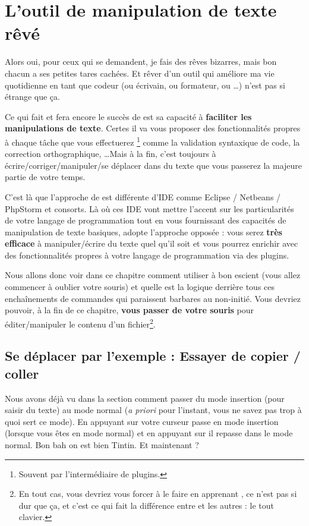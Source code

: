 \chapter{L'outil de manipulation de texte rêvé}

Alors oui, pour ceux qui se demandent, je fais des rêves bizarres, mais bon chacun a ses petites tares cachées. Et rêver d'un outil qui améliore ma vie quotidienne en tant que codeur (ou écrivain, ou formateur, ou \ldots) n'est pas si étrange que ça.

Ce qui fait et fera encore le succès de \vim est sa capacité à \textbf{faciliter les manipulations de texte}. Certes il va vous proposer des fonctionnalités propres à chaque tâche que vous effectuerez \footnote{Souvent par l'intermédiaire de plugins.} comme la validation syntaxique de code, la correction orthographique, \ldots Mais à la fin, c'est toujours à écrire/corriger/manipuler/se déplacer dans du texte que vous passerez la majeure partie de votre temps. 

C'est là que l'approche de \vim est différente d'IDE comme Eclipse / Netbeans / PhpStorm et consorts. Là où ces IDE vont mettre l'accent sur les particularités de votre langage de programmation tout en vous fournissant des capacités de manipulation de texte basiques, \vim adopte l'approche opposée : vous serez \textbf{très efficace} à manipuler/écrire du texte quel qu'il soit et vous pourrez enrichir \vim avec des fonctionnalités propres à votre langage de programmation via des plugins.

Nous allons donc voir dans ce chapitre comment utiliser \vim à bon escient (vous allez commencer à oublier votre souris) et quelle est la logique derrière tous ces enchaînements de commandes qui paraissent barbares au non-initié. Vous devriez pouvoir, à la fin de ce chapitre, \textbf{vous passer de votre souris} pour éditer/manipuler le contenu d'un fichier\footnote{En tout cas, vous devriez vous forcer à le faire en apprenant \vim, ce n'est pas si dur que ça, et c'est ce qui fait la différence entre \vim et les autres : le tout clavier.}.

\section{Se déplacer par l'exemple : Essayer de copier / coller}\label{sec:se-deplacer}


Nous avons déjà vu dans la section \og {} \fg{} comment passer du mode insertion (pour saisir du texte) au mode normal (\emph{a priori} pour l'instant, vous ne savez pas trop à quoi sert ce mode). En appuyant sur \tti votre curseur passe en mode insertion (lorsque vous êtes en mode normal) et en appuyant sur \ttesc il repasse dans le mode normal. Bon bah on est bien Tintin. Et maintenant ? 

